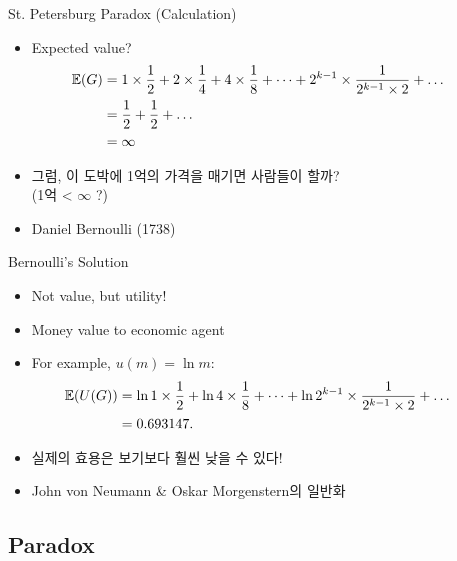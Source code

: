 \documentclass[final]{beamer}
\begin{document}
\begin{frame}[t]{St. Petersburg Paradox (Calculation)}
	\begin{itemize}
	\item Expected value? 
	\begin{align*}
	\hspace{-2em}\mathbb{E}(G)&= 1 \times \frac{1}{2} + 2 \times \frac{1}{4} + 4 \times \frac{1}{8} + \cdots + 2^{k-1} \times \frac{1}{2^{k-1} \times 2} + \ldots \\
	& = \frac{1}{2} + \frac{1}{2} + \ldots \\
	& = \infty
	\end{align*}
	\item 그럼, 이 도박에 1억의 가격을 매기면 사람들이 할까? \\
	(1억 < $\infty$ ?)
	\item Daniel Bernoulli (1738) 
	\end{itemize}
\end{frame}

\begin{frame}[t]{Bernoulli's Solution}
	\begin{itemize}
	\item Not value, but utility!
	\item Money value to economic agent
	\item For example, $u(m)=\ln{m}$: 
	\begin{align*}
	\hspace{-2em}\mathbb{E}(U(G))&= \ln{1} \times \frac{1}{2} + \ln{4} \times \frac{1}{8} + \cdots + \ln{2^{k-1}} \times \frac{1}{2^{k-1} \times 2} + \ldots \\
	& = 0.693147.
	\end{align*}
	\item 실제의 효용은 보기보다 훨씬 낮을 수 있다! 
	\item John von Neumann {\&} Oskar Morgenstern의 일반화
	\end{itemize}
\end{frame}

\subsection{Paradox} %
\label{ssec:precursors}
\end{document}

